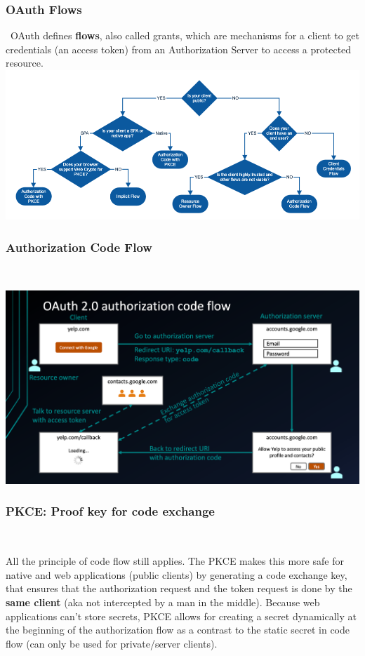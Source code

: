 \documentclass{beamer}
\begin{document}
\begin{frame}
	\frametitle{OAuth Flows}\
	OAuth defines \textbf{flows}, also called grants, which are mechanisms for a client to get credentials (an access token) from an Authorization Server to access a protected resource.
	\includegraphics[width=\textwidth]{./resources/oauth_grant_flowchart.png}	
\end{frame}

\begin{frame}
	\frametitle{Authorization Code Flow}\
	
	\includegraphics[width=\textwidth]{./resources/authorization-code-flow.png}
	
\end{frame}



\begin{frame}
	\frametitle{PKCE: Proof key for code exchange}\ \newline

	All the principle of code flow still applies. The PKCE makes this more safe for native and web applications (public clients) by generating a code exchange key, that ensures that the authorization request and the token request is done by the  \textbf{same client} (aka not intercepted by a man in the middle). Because web applications can’t store secrets, PKCE allows for creating a secret dynamically at the beginning of the authorization flow as a contrast to the static secret in code flow (can only be used for private/server clients).
	
\end{frame}
\end{document}

